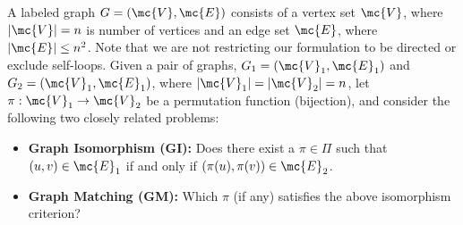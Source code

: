\documentclass[10pt,journal,cspaper,compsoc]{IEEEtran}
\newcommand{\PmcP}{P \in \mc{P}}
\begin{document}
A labeled graph $G=(\mc{V},\mc{E})$ consists of a vertex set $\mc{V}$, where $|\mc{V}|=n$ is number of vertices and an edge set $\mc{E}$, where $|\mc{E}| \leq n^2$. Note that we are not restricting our formulation to be directed or exclude self-loops. Given a pair of graphs, $G_1=(\mc{V}_1,\mc{E}_1)$ and $G_2=(\mc{V}_1,\mc{E}_1)$, where $|\mc{V}_1|=|\mc{V}_2|=n$, 
let $\pi: \mc{V}_1 \to \mc{V}_2$ be a permutation function (bijection), and consider the following two closely related problems:
\begin{itemize}
	\item \textbf{Graph Isomorphism (GI):}  Does there exist a $\pi \in \Pi$ such that $(u,v) \in \mc{E}_1$ if and only if $(\pi(u),\pi(v)) \in \mc{E}_2$. 
		\item \textbf{Graph Matching (GM):} Which $\pi$ (if any) satisfies the above isomorphism criterion?
\end{itemize}

\end{document}
